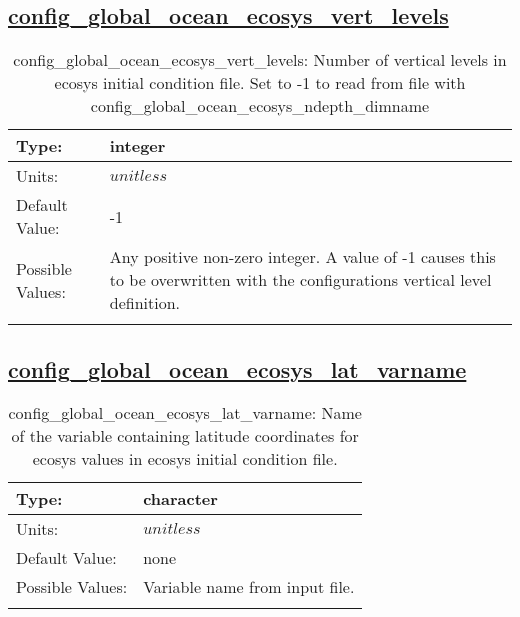 \subsection[config\_global\_ocean\_ecosys\_vert\_levels]{\hyperref[sec:nm_tab_global_ocean]{config\_global\_ocean\_ecosys\_vert\_levels}}
\label{subsec:nm_sec_config_global_ocean_ecosys_vert_levels}
\begin{center}
\begin{longtable}{| p{2.0in} || p{4.0in} |}
    \hline
    Type: & integer \\
    \hline
    Units: & $unitless$ \\
    \hline
    Default Value: & -1 \\
    \hline
    Possible Values: & Any positive non-zero integer. A value of -1 causes this to be overwritten with the configurations vertical level definition. \\
    \hline
    \caption{config\_global\_ocean\_ecosys\_vert\_levels: Number of vertical levels in ecosys initial condition file.  Set to -1 to read from file with config\_global\_ocean\_ecosys\_ndepth\_dimname}
\end{longtable}
\end{center}
\subsection[config\_global\_ocean\_ecosys\_lat\_varname]{\hyperref[sec:nm_tab_global_ocean]{config\_global\_ocean\_ecosys\_lat\_varname}}
\label{subsec:nm_sec_config_global_ocean_ecosys_lat_varname}
\begin{center}
\begin{longtable}{| p{2.0in} || p{4.0in} |}
    \hline
    Type: & character \\
    \hline
    Units: & $unitless$ \\
    \hline
    Default Value: & none \\
    \hline
    Possible Values: & Variable name from input file. \\
    \hline
    \caption{config\_global\_ocean\_ecosys\_lat\_varname: Name of the variable containing latitude coordinates for ecosys values in ecosys initial condition file.}
\end{longtable}
\end{center}
